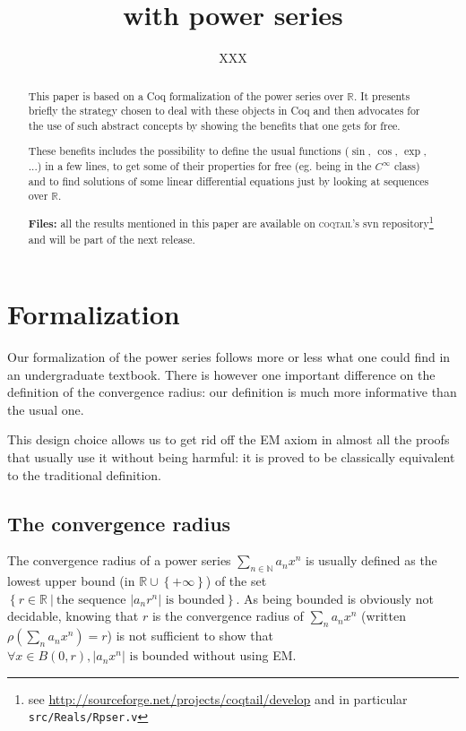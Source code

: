 \documentclass[submission,copyright]{eptcs}
\title{\coq{} with power series}
\author{XXX
\institute{Junior Laboratory \coqtail{}\\
Ens Lyon - France\\}
\email{XXX}}
\newcommand{\coq}{Coq}
\newcommand{\coqtail}{\textsc{coqtail}}
\newcommand{\N}{\mathbb{N}}
\newcommand{\R}{\mathbb{R}}
\begin{document}
\maketitle

\begin{abstract}
This paper is based on a \coq{} formalization of the power series over $\R$. It
presents briefly the strategy chosen to deal with these objects in \coq{} and
then advocates for the use of such abstract concepts by showing the benefits
that one gets for free.

These benefits includes the possibility to define the usual functions ($\sin$,
$\cos$, $\exp$, ...) in a few lines, to get some of their properties for free
(eg. being in the $C^{\infty}$ class) and to find solutions of some linear
differential equations just by looking at sequences over $\R$.

\textbf{Files:} all the results mentioned in this paper are available on
\coqtail{}'s svn repository\footnote{see \url{http://sourceforge.net/projects/coqtail/develop}
and in particular \texttt{src/Reals/Rpser.v}} and will
be part of the next release.

\end{abstract}

\section{Formalization}

Our formalization of the power series follows more or less what one could find
in an undergraduate textbook. There is however one important difference on the
definition of the convergence radius: our definition is much more informative
than the usual one.

This design choice allows us to get rid off the EM axiom in almost all the
proofs that usually use it without being harmful: it is proved to be classically
equivalent to the traditional definition.

\subsection{The convergence radius}

The convergence radius of a power series $\sum_{n \in \N} a_n x^n$ is usually
defined as the lowest upper bound (in $\R \cup \left\lbrace +\infty \right
\rbrace$) of the set $\left\lbrace r \in \R ~|~ \text{the sequence } \left|
a_n r^n\right| \text{ is bounded} \right\rbrace$.
As being bounded is obviously not decidable, knowing that $r$ is the convergence
radius of $\sum_n a_n x^n$ (written $\rho (\sum_n a_n x^n) = r$) is not
sufficient to show that $\forall x \in B(0,r), \left| a_n x^n \right| \text{ is
bounded}$ without using EM.
\end{document}
